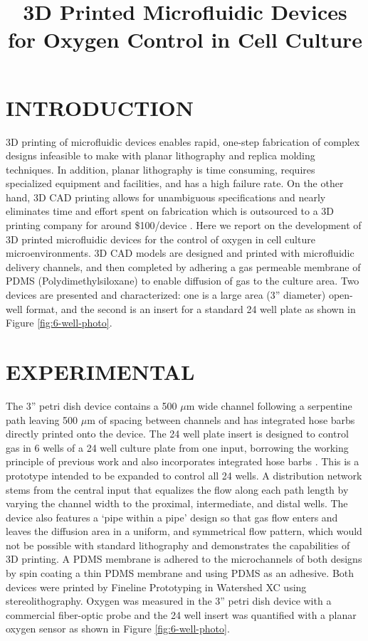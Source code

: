 \documentclass{article}
\title{3D Printed Microfluidic Devices for Oxygen Control in Cell Culture}
\begin{document}
\maketitle

\section{INTRODUCTION}

3D printing of microfluidic devices enables rapid, one-step fabrication of complex designs infeasible to make with planar lithography and replica molding techniques.
In addition, planar lithography is time consuming, requires specialized equipment and facilities, and has a high failure rate.
On the other hand, 3D CAD printing allows for unambiguous specifications and nearly eliminates time and effort spent on fabrication which is outsourced to a 3D printing company for around \$100/device \cite{Au2014,Chen2014}.
Here we report on the development of 3D printed microfluidic devices for the control of oxygen in cell culture microenvironments.
3D CAD models are designed and printed with microfluidic delivery channels, and then completed by adhering a gas permeable membrane of PDMS (Polydimethylsiloxane) to enable diffusion of gas to the culture area.
Two devices are presented and characterized: one is a large area (3” diameter) open-well format, and the second is an insert for a standard 24 well plate as shown in Figure \ref{fig:6-well-photo}.
 

\section{EXPERIMENTAL}

The 3” petri dish device contains a 500 $\mu$m wide channel following a serpentine path leaving 500 $\mu$m of spacing between channels and has integrated hose barbs directly printed onto the device.
The 24 well plate insert is designed to control gas in 6 wells of a 24 well culture plate from one input, borrowing the working principle of previous work and also incorporates integrated hose barbs \cite{Oppegard2010}.
This is a prototype intended to be expanded to control all 24 wells.
A distribution network stems from the central input that equalizes the flow along each path length by varying the channel width to the proximal, intermediate, and distal wells.
The device also features a ‘pipe within a pipe’ design so that gas flow enters and leaves the diffusion area in a uniform, and symmetrical flow pattern, which would not be possible with standard lithography and demonstrates the capabilities of 3D printing.
A PDMS membrane is adhered to the microchannels of both designs by spin coating a thin PDMS membrane and using PDMS as an adhesive.
Both devices were printed by Fineline Prototyping in Watershed XC using stereolithography.
Oxygen was measured in the 3” petri dish device with a commercial fiber-optic probe and the 24 well insert was quantified with a planar oxygen sensor as shown in Figure \ref{fig:6-well-photo}.
\end{document}
